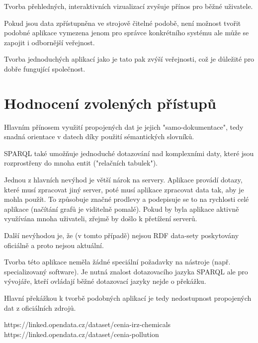 \documentclass[12pt]{article}
\begin{document}
Tvorba přehledných, interaktivních vizualizací zvyšuje přínos pro běžné uživatele.

Pokud jsou data zpřístupněna ve strojově čitelné podobě, není možnost tvořit podobné aplikace vymezena jenom pro správce konkrétního systému ale může se zapojit i odbornější veřejnost.

Tvorba jednoduchých aplikací jako je tato pak zvýší veřejnosti, což je důležité pro dobře fungující společnost.


\section*{Hodnocení zvolených přístupů}
Hlavním přínosem využití propojených dat je jejich "samo-dokumentace", tedy snadná orientace v datech díky použití sémantických slovníků.

SPARQL také umožňuje jednoduché dotazování nad komplexními daty, které jsou rozprostřeny do mnoha entit ("relačních tabulek").

Jednou z hlavních nevýhod je větší nárok na servery. Aplikace provádí dotazy, které musí zpracovat jiný server, poté musí aplikace zpracovat data tak, aby je mohla použít. To způsobuje značné prodlevy a podepisuje se to na rychlosti celé aplikace (načítání grafů je viditelně pomalé). Pokud by byla aplikace aktivně využívána mnoha uživateli, zřejmě by došlo k přetížení serverů.

Další nevýhodou je, že (v tomto případě) nejsou RDF data-sety poskytovány oficiálně a proto nejsou aktuální.

Tvorba této aplikace neměla žádné speciální požadavky na nástroje (např. specializovaný software). Je nutná znalost dotazovacího jazyka SPARQL ale pro vývojáře, kteří ovládají běžné dotazovací jazyky nejde o překážku.

Hlavní překážkou k tvorbě podobných aplikací je tedy nedostupnost propojených dat z oficiálních zdrojů.
 

\begin{thebibliography}{1}

	 https://linked.opendata.cz/dataset/cenia-irz-chemicals
	 https://linked.opendata.cz/dataset/cenia-pollution

\end{thebibliography}
\end{document}
